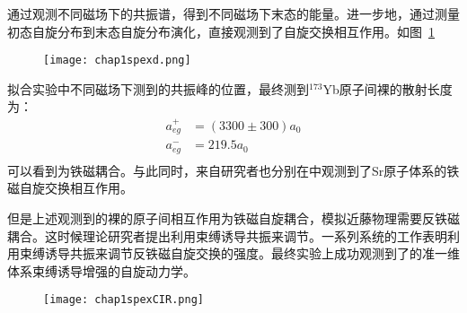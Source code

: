 通过观测不同磁场下的共振谱，得到不同磁场下末态的能量。进一步地，通过测量初态自旋分布到末态自旋分布演化\cite{scazza2014observation,cappellini2014direct}，直接观测到了自旋交换相互作用。如图~\ref{egd}~
\begin{figure}[!htbp]
    \centering
    \texttt{[image: chap1spexd.png]}
    \label{egd}
\end{figure}
拟合实验中不同磁场下测到的共振峰的位置，最终测到${}^{173}$Yb原子间裸的散射长度为\cite{scazza2014observation,cappellini2014direct}：
\begin{equation}
\begin{split}
a_{e g}^{+}&=(3300 \pm 300) a_{0}\\
a_{e g}^{-}& = 219.5 a_0\\
\end{split}
\end{equation}
可以看到为铁磁耦合。与此同时，来自研究者也分别在中观测到了Sr原子体系的铁磁自旋交换相互作用\cite{zhang2014spectroscopic}。

但是上述观测到的裸的原子间相互作用为铁磁自旋耦合，模拟近藤物理需要反铁磁耦合。这时候理论研究者提出利用束缚诱导共振来调节。一系列系统的工作表明利用束缚诱导共振来调节反铁磁自旋交换的强度\cite{zhang2016kondo,cheng2017enhancing,zhang2018control,ji2018confinement,zhang2020tight,zhang2020controlling}。最终实验上成功观测到了的准一维体系束缚诱导增强的自旋动力学\cite{riegger2018localized}。
\begin{figure}[!htbp]
    \centering
    \texttt{[image: chap1spexCIR.png]}
    \label{CIRspexexp}
\end{figure}









